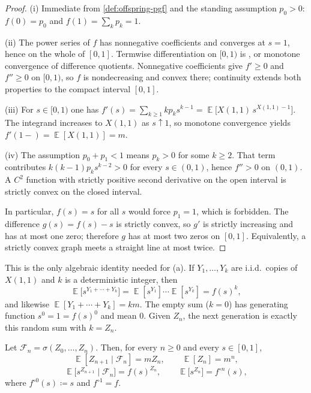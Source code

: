 \documentclass[11pt,a4paper]{article}
\DeclareMathOperator{\E}{\mathbb{E}}
\begin{document}
\begin{proof}
(i) Immediate from \cref{def:offspring-pgf} and the standing assumption \(p_0>0\): \(f(0)=p_0\) and \(f(1)=\sum_k p_k=1\).

(ii) The power series of \(f\) has nonnegative coefficients and converges at \(s=1\), hence on the whole of \([0,1]\). Termwise differentiation on \([0,1)\) is \citep[Theorem~A.5.2]{durrett2010}, or monotone convergence of difference quotients. Nonnegative coefficients give \(f'\ge 0\) and \(f''\ge 0\) on \([0,1)\), so \(f\) is nondecreasing and convex there; continuity extends both properties to the compact interval \([0,1]\).

(iii) For \(s\in[0,1)\) one has \(f'(s)=\sum_{k\ge 1} k p_k s^{k-1}=\E\bigl[X(1,1)\,s^{X(1,1)-1}\bigr]\). The integrand increases to \(X(1,1)\) as \(s\uparrow 1\), so monotone convergence yields \(f'(1-)=\E[X(1,1)]=m\).

(iv) The assumption \(p_0+p_1<1\) means \(p_k>0\) for some \(k\ge 2\). That term contributes \(k(k-1)p_k s^{k-2}>0\) for every \(s\in(0,1)\), hence \(f''>0\) on \((0,1)\). A \(C^2\) function with strictly positive second derivative on the open interval is strictly convex on the closed interval.

In particular, \(f(s)=s\) for all \(s\) would force \(p_1=1\), which is forbidden. The difference \(g(s)=f(s)-s\) is strictly convex, so \(g'\) is strictly increasing and has at most one zero; therefore \(g\) has at most two zeros on \([0,1]\). Equivalently, a strictly convex graph meets a straight line at most twice.
\end{proof}

\begin{example}
\label{ex:pgf-iid-sum}
This is the only algebraic identity needed for (a). If \(Y_1,\dots,Y_k\) are i.i.d.\ copies of \(X(1,1)\) and \(k\) is a deterministic integer, then
\[
\E\bigl[s^{Y_1+\cdots+Y_k}\bigr]
=
\E[s^{Y_1}]\cdots\E[s^{Y_k}]
=
f(s)^k,
\]
and likewise \(\E[Y_1+\cdots+Y_k]=km\). The empty sum (\(k=0\)) has generating function \(s^0=1=f(s)^0\) and mean \(0\). Given \(Z_n\), the next generation is exactly this random sum with \(k=Z_n\).
\end{example}

\begin{proposition}
\label{prop:gw-four}
Let \(\mathcal{F}_n=\sigma(Z_0,\dots,Z_n)\). Then, for every \(n\ge 0\) and every \(s\in[0,1]\),
\[
\E[Z_{n+1}\mid\mathcal{F}_n]
=
m Z_n,
\qquad
\E[Z_n]
=
m^n,
\]
\[
\E\bigl[s^{Z_{n+1}}\mid\mathcal{F}_n\bigr]
=
f(s)^{Z_n},
\qquad
\E\bigl[s^{Z_n}\bigr]
=
f^{\circ n}(s),
\]
where \(f^{\circ 0}(s)\coloneqq s\) and \(f^{\circ 1}=f\).
\end{proposition}
\end{document}
